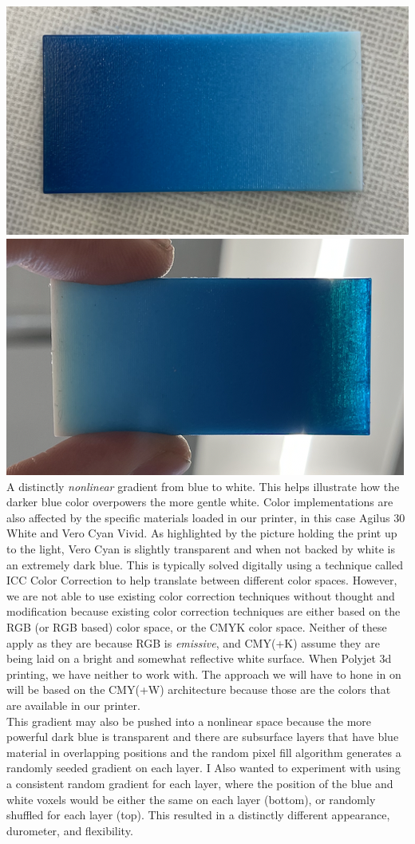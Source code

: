 \documentclass{article}
\begin{document}
\begin{multicols}{2}
\noindent
\includegraphics[width=.505\columnwidth]{linear-gradient-print}
\includegraphics[width=.485\columnwidth]{linear-gradient-print-light}
\\

\noindent
A distinctly \textit{nonlinear} gradient from blue to white. This helps illustrate how the darker blue color overpowers the more gentle white. Color implementations are also affected by the specific materials loaded in our printer, in this case Agilus 30 White and Vero Cyan Vivid. As highlighted by the picture holding the print up to the light, Vero Cyan is slightly transparent and when not backed by white is an extremely dark blue. This is typically solved digitally using a technique called ICC Color Correction to help translate between different color spaces. However, we are not able to use existing color correction techniques without thought and modification because existing color correction techniques are either based on the RGB (or RGB based) color space, or the CMYK color space. Neither of these apply as they are because RGB is \textit{emissive}, and CMY(+K) assume they are being laid on a bright and somewhat reflective white surface. When Polyjet 3d printing, we have neither to work with. The approach we will have to hone in on will be based on the CMY(+W) architecture because those are the colors that are available in our printer.
\\
This gradient may also be pushed into a nonlinear space because the more powerful dark blue is transparent and there are subsurface layers that have blue material in overlapping positions and the random pixel fill algorithm generates a randomly seeded gradient on each layer. I Also wanted to experiment with using a consistent random gradient for each layer, where the position of the blue and white voxels would be either the same on each layer (bottom), or randomly shuffled for each layer (top).  This resulted in a distinctly different appearance, durometer, and flexibility.


\end{multicols}
\end{document}
